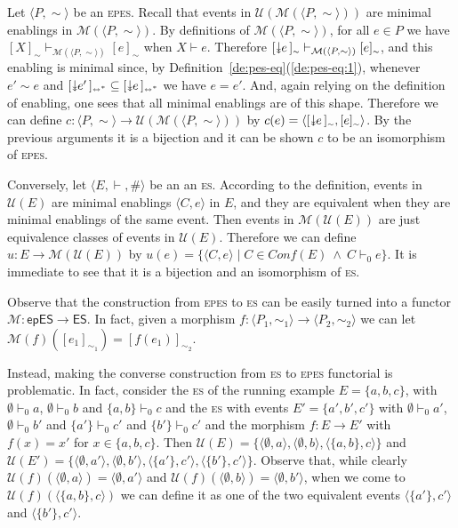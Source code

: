 \documentclass[conference]{IEEEtran}
\renewenvironment{proof}{\begin{IEEEproof}}{\end{IEEEproof}}
\newcommand{\esabbr}{\textsc{es}}
\newcommand{\eseqabbr}{\textsc{epes}}
\newcommand{\esir}[2]{\ensuremath{\langle{#1}, {#2}\rangle}}
\newcommand{\eqclass}[2][]{\ensuremath{[{#2}]_{\scriptscriptstyle {#1}}}}
\newcommand{\eqclassir}[1]{\ensuremath{\eqclass[\leftrightarrow^*]{#1}}}
\newcommand{\es}{\ensuremath{\mathsf{ES}}}
\newcommand{\epes}{\ensuremath{\mathsf{epES}}}
\newcommand{\zfuse}[0]{\ensuremath{\mathcal{M}}}
\newcommand{\fuse}[1]{\ensuremath{\zfuse({#1})}}
\newcommand{\unf}[1]{\ensuremath{\mathcal{U}({#1})}}
\newcommand{\conf}[1]{\ensuremath{\mathit{Conf}({#1})}}
\newcommand\twoheaddownarrow{\mathrel{\raisebox{0.8\depth}{\rotatebox{270}{$\twoheadrightarrow$}}}}
\newcommand{\scauses}[1]{\ensuremath{\twoheaddownarrow\!\!{#1}\,}}
\begin{document}
\begin{proof}
  Let $\langle P, \sim \rangle$ be an {\eseqabbr}.
  Recall that events in
  $\unf{\fuse{\langle P, \sim\rangle}}$ are minimal
  enablings in $\fuse{\langle P, \sim\rangle}$.
  By definitions of $\fuse{\langle P, \sim\rangle}$, for all $e \in P$
  we have
  $\eqclass[\sim]{X} \vdash_{\fuse{\langle P, \sim\rangle}}
  \eqclass[\sim]{e}$ when $X \vdash e$. Therefore
  $\eqclass[\sim]{\scauses{e}} \vdash_{\fuse{\langle P, \sim\rangle}}
  \eqclass[\sim]{e}$, and this enabling is minimal since, by
  Definition~\ref{de:pes-eq}(\ref{de:pes-eq:1}), whenever $e' \sim e$
  and $\eqclassir{\scauses{e'}} \subseteq \eqclassir{\scauses{e}}$ we
  have $e=e'$. And, again relying on the definition of enabling, one
  sees that all minimal enablings are of this shape.
  Therefore we can define
  $c : \langle P, \sim \rangle \to \unf{\fuse{\langle P,
      \sim\rangle}}$ by
  $c(e) =
  \esir{\eqclass[\sim]{\scauses{e}}}{\eqclass[\sim]{e}}$.
  By the previous arguments it is a bijection and it can be shown $c$
  to be an isomorphism of {\eseqabbr}.
  

  \smallskip

  Conversely, let $\langle E, \vdash, \# \rangle$ be an an
  {\esabbr}.
  According to the definition, events in $\unf{E}$ are minimal
  enablings $\esir{C}{e}$ in $E$, and they are equivalent when they are minimal
  enablings of the same event.
  Then events in $\fuse{\unf{E}}$ are just equivalence classes of events in $\unf{E}$. Therefore we can define $u : E \to \fuse{\unf{E}}$ by
  $u(e) = \{ \esir{C}{e} \mid C \in \conf{E}\ \land\ C \vdash_0 e \}$. It is
  immediate to see that it is a bijection and 
  an isomorphism of {\esabbr}.
\end{proof}


Observe that the construction from {\eseqabbr} to {\esabbr} can be
easily turned into a functor $\zfuse : \epes \to \es$. In fact, given a
morphism
$f : \langle P_1, \sim_1 \rangle \to \langle P_2, \sim_2\rangle$ we
can let $\fuse{f}(\eqclass[\sim_1]{e_1}) = \eqclass[\sim_2]{f(e_1)}$.

Instead, making the converse construction from {\esabbr} to
{\eseqabbr} functorial is problematic. In fact, consider the {\esabbr} of the running example
$E = \{ a, b, c \}$, with $\emptyset \vdash_0 a$,
$\emptyset \vdash_0 b$ and $\{ a, b \} \vdash_0 c$ and the
{\esabbr} with events $E' = \{ a', b', c' \}$ with
$\emptyset \vdash_0 a'$, $\emptyset \vdash_0 b'$ and
$\{ a' \} \vdash_0 c'$ and $\{ b' \} \vdash_0 c'$ and the morphism
$f : E \to E'$ with $f(x) = x'$ for $x \in \{ a, b, c\}$. Then
$\unf{E} = \{ \esir{\emptyset}{a}, \esir{\emptyset}{b},
\esir{\{a, b\}}{c} \}$ and
$\unf{E'} = \{ \esir{\emptyset}{a'}, \esir{\emptyset}{b'},
\esir{\{a'\}}{c'}, \esir{\{b'\}}{c'} \}$. Observe that, while clearly
$\unf{f}(\esir{\emptyset}{a}) = \esir{\emptyset}{a'}$ and
$\unf{f}(\esir{\emptyset}{b}) = \esir{\emptyset}{b'}$, when we come
to $\unf{f}(\esir{\{a,b\}}{c})$ we can define it as one of the
two equivalent events $\esir{\{a'\}}{c'}$ and $\esir{\{b'\}}{c'}$.
\end{document}
